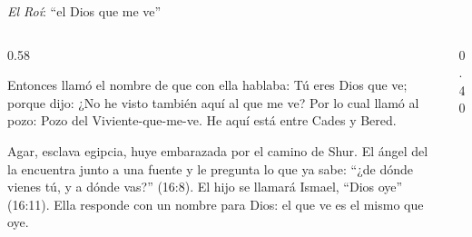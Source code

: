\begin{frame}{\emph{El Roí}: ``el Dios que me ve''}
\begin{columns}[c,onlytextwidth]
\begin{column}{0.58\textwidth}
\begin{cita}[fontupper=\scriptsize\itshape]Entonces llamó el nombre de \SENOR{} que con ella hablaba: Tú eres Dios que ve; porque dijo: ¿No he visto también aquí al que me ve? Por lo cual llamó al pozo: Pozo del Viviente-que-me-ve. He aquí está entre Cades y Bered.\end{cita}
\scriptsize\RaggedRight Agar, esclava egipcia, huye embarazada por el camino de Shur. El ángel del \SENOR{} la encuentra junto a una fuente y le pregunta lo que ya sabe: ``¿de dónde vienes tú, y a dónde vas?'' (16:8). El hijo se llamará Ismael, ``Dios oye'' (16:11). Ella responde con un nombre para Dios: el que ve es el mismo que oye.
\end{column}
\begin{column}{0.40\textwidth}\end{column}
\end{columns}
\end{frame}

